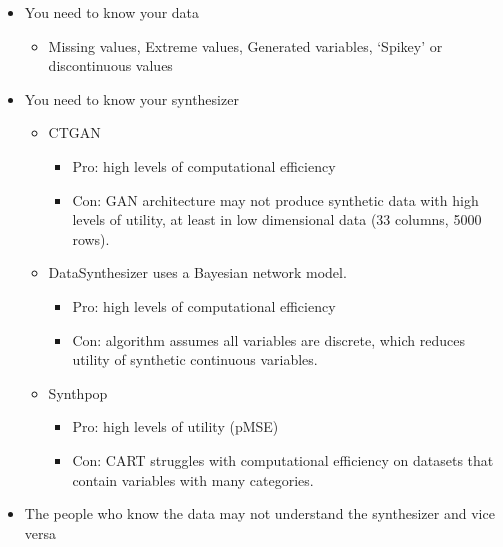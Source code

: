 \documentclass[t,8pt,utfx8]{beamer}
\begin{document}
\begin{spacing}{1.25}
{\begin{itemize}
    \item You need to know your data 
    \begin{itemize}
        \item Missing values, Extreme values, Generated variables, `Spikey' or discontinuous values
    \end{itemize}
    \item You need to know your synthesizer
    \begin{itemize}
        \item CTGAN 
        \begin{itemize}
            \item Pro: high levels of computational efficiency
            \item Con: GAN architecture may not produce synthetic data with high levels of utility, at least in low dimensional data (33 columns, 5000 rows).
        \end{itemize}
        \item DataSynthesizer uses a Bayesian network model.
        \begin{itemize}
             \item Pro: high levels of computational efficiency
             \item Con: algorithm assumes all variables are discrete, which reduces utility of synthetic continuous variables. 
         \end{itemize} 
        \item Synthpop 
        \begin{itemize}
             \item Pro: high levels of utility (pMSE)
             \item Con: CART struggles with computational efficiency on datasets that contain variables with many categories. 
         \end{itemize} 
    \end{itemize}
    \item The people who know the data may not understand the synthesizer and vice versa
\end{itemize}
}


\end{spacing}
\end{document}
